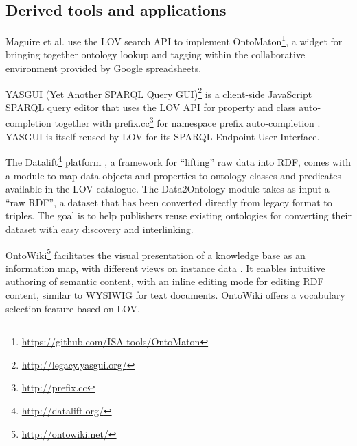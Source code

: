 \documentclass{iosart2c}
\begin{document}
\subsection{Derived tools and applications}

Maguire et al. \cite{ontomaton12} use the LOV search API to implement OntoMaton\footnote{\url{https://github.com/ISA-tools/OntoMaton}}, a widget for bringing together ontology lookup and tagging within the collaborative environment provided by Google spreadsheets. 

YASGUI (Yet Another SPARQL Query GUI)\footnote{\url{http://legacy.yasgui.org/}} is a client-side JavaScript SPARQL query editor that uses the LOV API for property and class auto-completion together with prefix.cc\footnote{\url{http://prefix.cc}} for namespace prefix auto-completion \cite{yasgui}. YASGUI is itself reused by LOV for its SPARQL Endpoint User Interface.

The Datalift\footnote{\url{http://datalift.org/}} platform \cite{scharffe_2012}, a framework for ``lifting'' raw data into RDF, comes with a module to map data objects and properties to ontology classes and predicates available in the LOV catalogue. The Data2Ontology module takes as input a ``raw RDF'', a dataset that has been converted directly from legacy format to triples. The goal is to help publishers reuse existing ontologies for converting their dataset with easy discovery and interlinking. 

OntoWiki\footnote{\url{http://ontowiki.net/}} facilitates the visual presentation of a knowledge base as an information map, with different views on instance data \cite{auer2006ontowiki}. It enables intuitive authoring of semantic content, with an inline editing mode for editing RDF content, similar to WYSIWIG for text documents. OntoWiki offers a vocabulary selection feature based on LOV.
\end{document}
